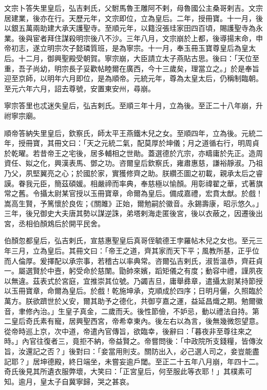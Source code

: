 \begin{pinyinscope}
 文宗卜答失里皇后，弘吉剌氏，父駙馬魯王雕阿不剌，母魯國公主桑哥剌吉。文宗居建業，後亦在行。天歷元年，文宗即位，立為皇后。二年，授冊寶。十一月，後以銀五萬兩助建大承天護聖寺。至順元年，以籍沒張珪家田四百頃，賜護聖寺為永業。後與宦者拜住謀殺明宗後八不沙。三年八月，文宗崩於上都，後導揚末命，申帝初志，遂立明宗次子懿璘質班，是為寧宗。十一月，奉玉冊玉寶尊皇后為皇太后。十二月，御興聖殿受朝賀。寧宗崩，大臣請立太子燕貼古思。後曰：「天位至重，吾子尚幼，明宗長子妥歡帖睦爾在廣西，今十三歲矣，理當立之。」於是奉旨迎至京師，以明年六月即位，是為順帝。元統元年，尊為太皇太后，仍稱制臨朝。至元六年六月，詔去尊號，安置東安州，尋崩。



 寧宗答里也忒迷失皇后，弘吉剌氏。至順三年十月，立為後。至正二十八年崩，升祔寧宗廟。



 順帝答納失里皇后，欽察氏，師太平王燕鐵木兒之女。至順四年，立為後。元統二年，授冊寶，其冊文曰：「天之元統二氣，配莫厚於坤儀；月之道循右行，明周貞於乾曜。若昔帝王之宅後，居多輔相之世勛。蓋選德於亢宗，亦疇庸於先正。造周資任、姒之化，興漢表馬、鄧之功。咨爾皇后欽察氏，雍肅惠慈，謙裕靜淑。乃祖乃父，夙堅翼亮之心；於國於家，實獲修齊之助。朕纘丕圖之初載，親承太后之睿謨。眷我元臣，簡茲碩媛。相嚴禘而率典，奉慈極以愉顏。用彰禕翟之華，式著旗常之舊。令攝太尉某官授以玉冊寶章，命爾為皇后。備成嘉禮，宏賁太猷。於戲！嵩高生賢，予篤懷於良佐；《關雎》正始，爾勉嗣於徽音。永錫壽康，昭示悠久。」三年，後兄御史大夫唐其勢以謀逆誅，弟塔剌海走匿後宮，後以衣蔽之，因遷後出宮，丞相伯顏鴆后於開平民舍。



 伯顏忽都皇后，弘吉剌氏，宣慈惠聖皇后真哥侄毓德王孛羅帖木兒之女也。至元三年三月，立為皇后。其冊文曰：「帝王之道，齊其家而天下平；風教所基，正乎位而人倫厚。爰擇配以承宗事，若稽古以率典常。咨爾弘吉剌氏，淑哲溫恭，齊莊貞一。屬選賢於中壼，躬受命於慈闈。勖帥來嬪，蹈矩儀之有度；動容中禮，謹夙夜以無違。茲表式於宮庭，宜推崇其位號。乃蠲吉旦，庸舉彞章，遣攝太尉某持節授以玉冊寶章，命爾為皇后。於戲！乾施坤承，克順成於四序；日明月儷，久照臨於萬方。朕欲躋世於乂安，爾其助予之德化，共御亨嘉之運，益延昌熾之期。勉爾徽音，聿修內治。」生皇子真金，二歲而夭。後性節儉，不妒忌，動以禮法自持。第二皇后奇氏素有寵，居興聖西宮，帝希幸東內。後左右以為言，後無幾微怨望意。從帝時巡上京，次中道，帝遣內官傳旨，欲臨幸，後辭曰：「暮夜非至尊往來之時。」內官往復者三，竟拒不納，帝益賢之。帝嘗問後：「中政院所支錢糧，皆傳汝旨，汝還記之否？」後對曰：「妾當用則支。關防出入，必己選人司之，妾豈能盡記耶？」居坤德殿，終日端坐，未嘗妄逾戶閾。至正二十五年八月崩，年四十二。奇氏後見其所遺衣服弊壞，大笑曰：「正宮皇后，何至服此等衣耶！」其樸素可知。逾月，皇太子自冀寧歸，哭之甚哀。




\end{pinyinscope}
